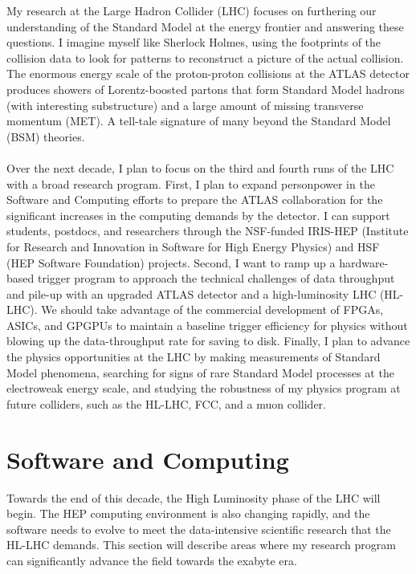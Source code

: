 \documentclass[10pt,a4paper,sans]{moderncv} %
\begin{document}
My research at the Large Hadron Collider (LHC) focuses on furthering our understanding of the Standard Model at the energy frontier and answering these questions. I imagine myself like Sherlock Holmes, using the footprints of the collision data to look for patterns to reconstruct a picture of the actual collision. The enormous energy scale of the proton-proton collisions at the ATLAS detector produces showers of Lorentz-boosted partons that form Standard Model hadrons (with interesting substructure) and a large amount of missing transverse momentum (MET). A tell-tale signature of many beyond the Standard Model (BSM) theories.
\\
\\
Over the next decade, I plan to focus on the third and fourth runs of the LHC with a broad research program. First, I plan to expand personpower in the Software and Computing efforts to prepare the ATLAS collaboration for the significant increases in the computing demands by the detector. I can support students, postdocs, and researchers through the NSF-funded IRIS-HEP (Institute for Research and Innovation in Software for High Energy Physics) and HSF (HEP Software Foundation) projects. Second, I want to ramp up a hardware-based trigger program to approach the technical challenges of data throughput and pile-up with an upgraded ATLAS detector and a high-luminosity LHC (HL-LHC). We should take advantage of the commercial development of FPGAs, ASICs, and GPGPUs to maintain a baseline trigger efficiency for physics without blowing up the data-throughput rate for saving to disk. Finally, I plan to advance the physics opportunities at the LHC by making measurements of Standard Model phenomena, searching for signs of rare Standard Model processes at the electroweak energy scale, and studying the robustness of my physics program at future colliders, such as the HL-LHC, FCC, and a muon collider.

\section{Software and Computing}
Towards the end of this decade, the High Luminosity phase of the LHC will begin. The HEP computing environment is also changing rapidly, and the software needs to evolve to meet the data-intensive scientific research that the HL-LHC demands. This section will describe areas where my research program can significantly advance the field towards the exabyte era.
\end{document}
